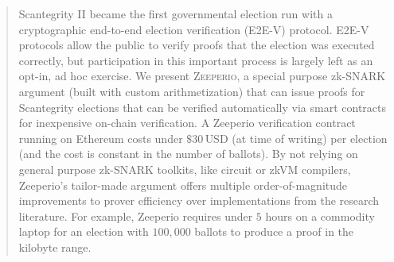 \begin{abstract}

Scantegrity II became the first governmental election run with a cryptographic end-to-end election verification (E2E-V) protocol. 
E2E-V protocols allow the public to verify proofs that the election was executed correctly, but participation in this important process is largely left as an opt-in, ad hoc exercise. 
We present \textsc{Zeeperio}, a special purpose zk-SNARK argument (built with custom arithmetization) that can issue proofs for Scantegrity elections that can be verified automatically via smart contracts for inexpensive on-chain verification.
A Zeeperio verification contract running on Ethereum costs under $\$30\,$USD (at time of writing) per election (and the cost is constant in the number of ballots).
By not relying on general purpose zk-SNARK toolkits, like circuit or zkVM compilers, Zeeperio's tailor-made argument offers multiple order-of-magnitude improvements to prover efficiency over implementations from the research literature. For example, Zeeperio requires under $5$ hours on a commodity laptop for an election with $100{,}000$ ballots to produce a proof in the kilobyte range. 







\end{abstract}